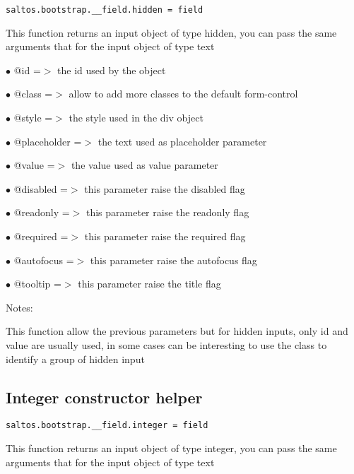 \documentclass[a4paper]{book}
\begin{document}
\begin{lstlisting}
saltos.bootstrap.__field.hidden = field
\end{lstlisting}

This function returns an input object of type hidden, you can pass the same arguments
that for the input object of type text

\begin{compactitem}
\item[\color{myblue}$\bullet$] @id          =$>$ the id used by the object
\item[\color{myblue}$\bullet$] @class       =$>$ allow to add more classes to the default form-control
\item[\color{myblue}$\bullet$] @style       =$>$ the style used in the div object
\item[\color{myblue}$\bullet$] @placeholder =$>$ the text used as placeholder parameter
\item[\color{myblue}$\bullet$] @value       =$>$ the value used as value parameter
\item[\color{myblue}$\bullet$] @disabled    =$>$ this parameter raise the disabled flag
\item[\color{myblue}$\bullet$] @readonly    =$>$ this parameter raise the readonly flag
\item[\color{myblue}$\bullet$] @required    =$>$ this parameter raise the required flag
\item[\color{myblue}$\bullet$] @autofocus   =$>$ this parameter raise the autofocus flag
\item[\color{myblue}$\bullet$] @tooltip     =$>$ this parameter raise the title flag
\end{compactitem}

Notes:

This function allow the previous parameters but for hidden inputs, only id
and value are usually used, in some cases can be interesting to use the
class to identify a group of hidden input

\hypertarget{toc437}{}
\subsection{Integer constructor helper}

\begin{lstlisting}
saltos.bootstrap.__field.integer = field
\end{lstlisting}

This function returns an input object of type integer, you can pass the same arguments
that for the input object of type text
\end{document}
